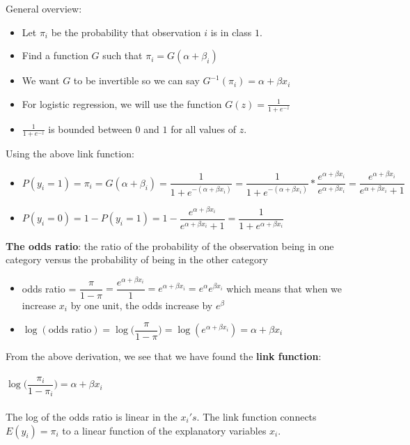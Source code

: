\documentclass{article}
\begin{document}
General overview:
\begin{itemize}
    \item Let $\pi_i$ be the probability that observation $i$ is in class $1$.
    \item Find a function $G$ such that $\pi_i = G(\alpha + \beta_i)$
    \item We want $G$ to be invertible so we can say $G^{-1}(\pi_i) = \alpha + \beta x_i$
    \item For logistic regression, we will use the function $G(z) = \frac{1}{1+e^{-z}}$
    \item $\frac{1}{1+e^{-z}}$ is bounded between $0$ and $1$ for all values of $z$.
\end{itemize}

\noindent Using the above link function:
\begin{itemize}
    

\item $P(y_i = 1) = \pi_i = G(\alpha + \beta_i) = \dfrac{1}{1 + e^{-(\alpha + \beta x_i)}}  = \dfrac{1}{1 + e^{-(\alpha + \beta x_i)}} * \dfrac{e^{\alpha + \beta x_i}}{e^{\alpha + \beta x_i}} = \dfrac{e^{\alpha + \beta x_i}}{e^{\alpha + \beta x_i} + 1}$
\item $P(y_i = 0) = 1 - P(y_i = 1) = 1 - \dfrac{e^{\alpha + \beta x_i}}{e^{\alpha + \beta x_i} + 1} = \dfrac{1}{1 + e^{\alpha + \beta x_i}}$

\end{itemize}

\noindent \textbf{The odds ratio}: the ratio of the probability of the observation being in one category versus the probability of being in the other category
\begin{itemize}
    
\item odds ratio = $\dfrac{\pi}{1-\pi} = \dfrac{e^{\alpha + \beta x_i}}{1} = e^{\alpha + \beta x_i} = e^{\alpha}e^{\beta x_i}$ which means that when we increase $x_i$ by one unit, the odds increase by $e^{\beta}$

\item $\log(\text{odds ratio}) = \log\big(\dfrac{\pi}{1-\pi}\big) = \log(e^{\alpha + \beta x_i}) = \alpha + \beta x_i$
\end{itemize}

\noindent From the above derivation, we see that we have found the \textbf{link function}:\\\\
$\log\big(\dfrac{\pi_i}{1-\pi_i}\big) = \alpha + \beta x_i$
\\\\
The log of the odds ratio is linear in the ${x_i} 's$. The link function connects $E(y_i) = \pi_i$ to a linear function of the explanatory variables $x_i$.
\end{document}
